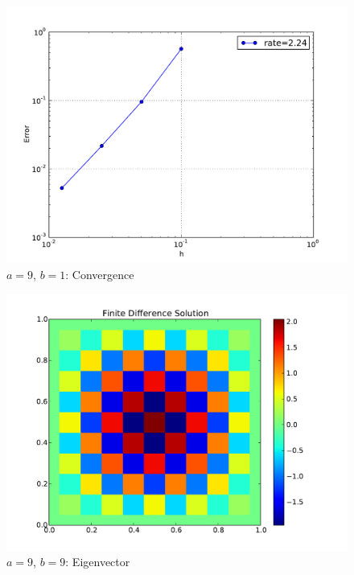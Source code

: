 \documentclass[10pt,letterpaper]{article}
\begin{document}
\begin{figure}[p]
\begin{center}
\includegraphics[width=5in,keepaspectratio]{be91.pdf}
\end{center}
\caption{$a=9$, $b=1$: Convergence}
\end{figure}

\begin{figure}[p]
\begin{center}
\includegraphics[width=5in,keepaspectratio]{b99.pdf}
\end{center}
\caption{$a=9$, $b=9$: Eigenvector}
\end{figure}
\end{document}
